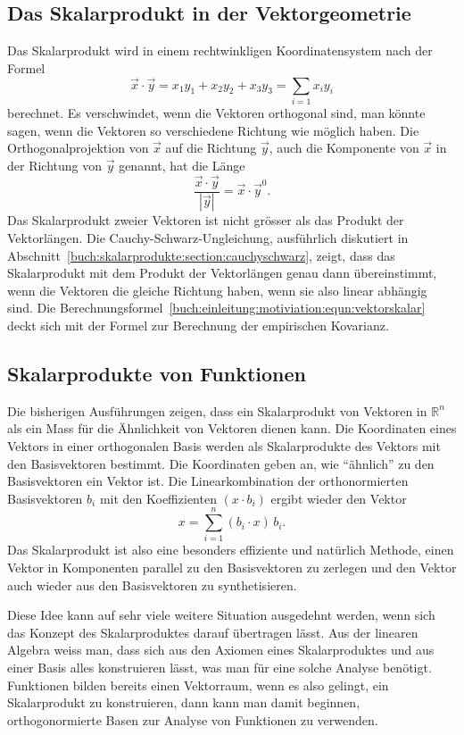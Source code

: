%
%
\subsection{Das Skalarprodukt in der Vektorgeometrie}
Das Skalarprodukt wird in einem rechtwinkligen Koordinatensystem nach der
Formel
\begin{equation}
\vec{x}\cdot\vec{y} = x_1y_1 + x_2y_2 + x_3y_3 = \sum_{i=1} x_iy_i
\label{buch:einleitung:motiviation:equn:vektorskalar}
\end{equation}
berechnet.
Es verschwindet, wenn die Vektoren orthogonal sind, man könnte sagen,
wenn die Vektoren so verschiedene Richtung wie möglich haben.
Die Orthogonalprojektion von $\vec{x}$ auf die Richtung $\vec{y}$,
auch die Komponente von $\vec{x}$ in der Richtung von $\vec{y}$ genannt,
hat die Länge 
\[
\frac{\vec{x}\cdot\vec{y}}{|\vec{y}|}
=
\vec{x}\cdot \vec{y}^0.
\]
Das Skalarprodukt zweier Vektoren ist nicht grösser als das Produkt
der Vektorlängen.
Die Cauchy-Schwarz-Ungleichung, ausführlich diskutiert in
%
Abschnitt~\ref{buch:skalarprodukte:section:cauchyschwarz},
zeigt, dass das Skalarprodukt mit dem Produkt der Vektorlängen
genau dann übereinstimmt, wenn die Vektoren die gleiche Richtung
haben, wenn sie also linear abhängig sind.
Die Berechnungsformel~\eqref{buch:einleitung:motiviation:equn:vektorskalar}
deckt sich mit der Formel zur Berechnung der empirischen Kovarianz.

%
%
\subsection{Skalarprodukte von Funktionen}
Die bisherigen Ausführungen zeigen, dass ein Skalarprodukt von
Vektoren in $\mathbb{R}^n$ als ein Mass für die Ähnlichkeit von Vektoren
dienen kann. 
Die Koordinaten eines Vektors in einer orthogonalen Basis werden
als Skalarprodukte des Vektors mit den Basisvektoren bestimmt.
Die Koordinaten geben an, wie ``ähnlich'' zu den Basisvektoren ein Vektor
ist.
Die Linearkombination der orthonormierten Basisvektoren $b_i$ mit den
Koeffizienten $(x\cdot b_i)$ ergibt wieder den Vektor 
\[
x = \sum_{i=1}^n (b_i\cdot x) \, b_i.
\]
Das Skalarprodukt ist also eine besonders effiziente und natürlich
Methode, einen Vektor in Komponenten parallel zu den Basisvektoren
zu zerlegen und den Vektor auch wieder aus den Basisvektoren zu
synthetisieren.

Diese Idee kann auf sehr viele weitere Situation ausgedehnt werden,
wenn sich das Konzept des Skalarproduktes darauf übertragen lässt.
Aus der linearen Algebra \cite{buch:linalg} weiss man, dass sich
aus den Axiomen eines 
Skalarproduktes und aus einer Basis alles konstruieren lässt, was
man für eine solche Analyse benötigt.
Funktionen bilden bereits einen Vektorraum, wenn es also gelingt,
ein Skalarprodukt zu konstruieren, dann kann man damit beginnen,
orthogonormierte Basen zur Analyse von Funktionen zu verwenden.

